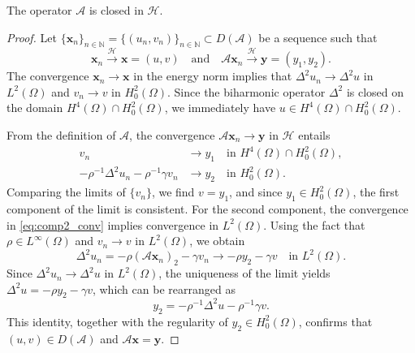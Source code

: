 \documentclass[10pt,a4paper]{amsart}
\begin{document}
	\begin{lemm}[Closedness] \label{lemm3}
		The operator \( \mathcal{A} \) is closed in \( \mathcal{H} \).
	\end{lemm}

	\begin{proof}
		Let \( \{\mathbf{x}_n\}_{n\in\mathbb{N}} = \{(u_n, v_n)\}_{n\in\mathbb{N}} \subset D(\mathcal{A}) \) be a sequence such that 
		\begin{equation*}\label{eq:conv_sequences}
			\mathbf{x}_n \xrightarrow{\mathcal{H}} \mathbf{x} = (u, v) \quad \text{and} \quad \mathcal{A}\mathbf{x}_n \xrightarrow{\mathcal{H}} \mathbf{y} = (y_1, y_2).
		\end{equation*}
		The convergence $\mathbf{x}_n \to \mathbf{x}$ in the energy norm implies that $\Delta^2 u_n \to \Delta^2 u$ in $L^2(\Omega)$ and $v_n \to v$ in $H_0^2(\Omega)$. Since the biharmonic operator $\Delta^2$ is closed on the domain $H^4(\Omega) \cap H_0^2(\Omega)$, we immediately have $u \in H^4(\Omega) \cap H_0^2(\Omega)$.
		
		From the definition of $\mathcal{A}$, the convergence $\mathcal{A}\mathbf{x}_n \to \mathbf{y}$ in $\mathcal{H}$ entails
		\begin{align}
			v_n &\to y_1 \quad \text{in } H^4(\Omega) \cap H_0^2(\Omega), \label{eq:v_n_conv_H4} \\
			-\rho^{-1} \Delta^2 u_n - \rho^{-1} \gamma v_n &\to y_2 \quad \text{in } H_0^2(\Omega). \label{eq:comp2_conv}
		\end{align}
		Comparing the limits of $\{v_n\}$, we find $v = y_1$, and since $y_1 \in H_0^2(\Omega)$, the first component of the limit is consistent. For the second component, the convergence in \eqref{eq:comp2_conv} implies convergence in $L^2(\Omega)$. Using the fact that $\rho \in L^\infty(\Omega)$ and $v_n \to v$ in $L^2(\Omega)$, we obtain
		\[
		\Delta^2 u_n = -\rho (\mathcal{A}\mathbf{x}_n)_2 - \gamma v_n \to -\rho y_2 - \gamma v \quad \text{in } L^2(\Omega).
		\]
		Since $\Delta^2 u_n \to \Delta^2 u$ in $L^2(\Omega)$, the uniqueness of the limit yields $\Delta^2 u = -\rho y_2 - \gamma v$, which can be rearranged as
		\[
		y_2 = -\rho^{-1} \Delta^2 u - \rho^{-1} \gamma v.
		\]
		This identity, together with the regularity of $y_2 \in H_0^2(\Omega)$, confirms that $(u, v) \in D(\mathcal{A})$ and $\mathcal{A}\mathbf{x} = \mathbf{y}$.
	\end{proof}
\end{document}
